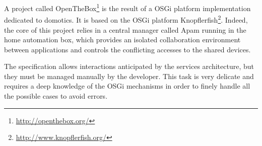 \begin{itemize}
	A project called OpenTheBox\footnote{\url{http://openthebox.org/}} is the result of a OSGi platform implementation dedicated to domotics.
	It is based on the OSGi platform Knopflerfish\footnote{\url{http://www.knopflerfish.org/}}.
	Indeed, the core of this project relies in a central manager called Apam\cite{damou2013apam} running in the home automation box, which provides an isolated collaboration environment between applications\cite{estublier2012managing} and controls the conflicting accesses to the shared devices\cite{estublier2013resource}.
	
	The specification allows interactions anticipated by the services architecture, but they must be managed manually by the developer.
	This task is very delicate and requires a deep knowledge of the OSGi mechanisms in order to finely handle all the possible cases to avoid errors.





\end{itemize}

